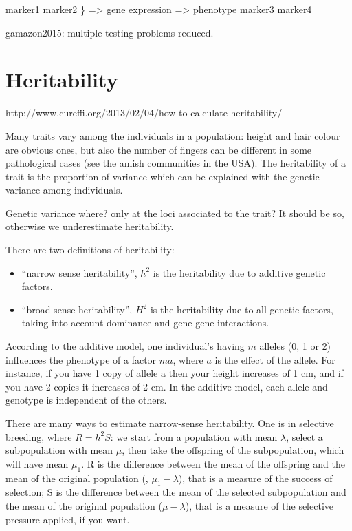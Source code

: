 \documentclass[../main.tex]{subfiles}
\begin{document}
marker1
marker2
			\} => gene expression => phenotype
marker3
marker4

gamazon2015: multiple testing problems reduced.

\section{Heritability}

http://www.cureffi.org/2013/02/04/how-to-calculate-heritability/

Many traits vary among the individuals in a population: height and hair 
colour are obvious ones, but also the number of fingers can be different 
in some pathological cases (see the amish communities in the USA). The 
heritability of a trait is the proportion of variance which can be 
explained with the genetic variance among individuals.

Genetic variance where? only at the loci associated to the trait? It 
should be so, otherwise we underestimate heritability.

There are two definitions of heritability:

\begin{itemize}
	\item \enquote{narrow sense heritability}, $h^2$ is the heritability 
		due to additive genetic factors.
	\item \enquote{broad sense heritability}, $H^2$ is the heritability 
		due to all genetic factors, taking into account dominance and 
		gene-gene interactions.
\end{itemize}

According to the additive model, one individual's having $m$ alleles (0, 
1 or 2) influences the phenotype of a factor $m a$, where $a$ is the 
  effect of the allele. For instance, if you have 1 copy of allele a 
then your height increases of 1 cm, and if you have 2 copies it 
increases of 2 cm. In the additive model, each allele and genotype is 
independent of the others.

There are many ways to estimate narrow-sense heritability. One is in 
selective breeding, where $R = h^2 S$: we start from a population with 
mean $\lambda$, select a subpopulation with mean $\mu$, then take the 
offspring of the subpopulation, which will have mean $\mu_1$. R is the 
difference between the mean of the offspring and the mean of the 
original population (\ie, $\mu_1 - \lambda$), that is a measure of the 
success of selection; S is the difference between the mean of the 
selected subpopulation and the mean of the original population (\ie $\mu 
- \lambda$), that is a measure of the selective pressure applied, if you 
want.
\end{document}
